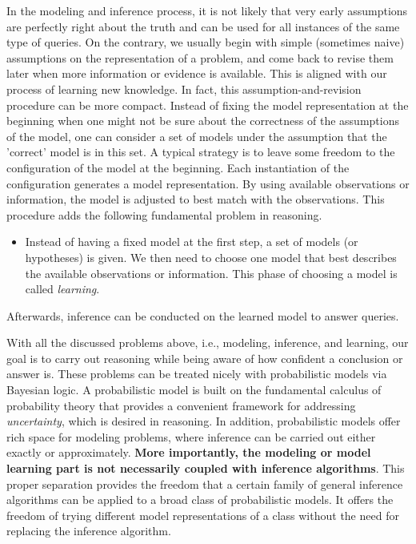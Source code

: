 In the modeling and inference process, it is not likely that very early assumptions are perfectly right about the truth and can be used for all instances of the same type of queries. On the contrary, we usually begin with simple (sometimes naive) assumptions on the representation of a problem, and come back to revise them later when more information or evidence is available. This is aligned with our process of learning new knowledge. In fact, this assumption-and-revision procedure can be more compact. Instead of fixing the model representation at the beginning when one might not be sure about the correctness of the assumptions of the model, one can consider a set of models under the assumption that the 'correct' model is in this set. A typical strategy is to leave some freedom to the configuration of the model at the beginning. Each instantiation of the configuration generates a model representation. By using available observations or information, the model is adjusted to best match with the observations. This procedure adds the following fundamental problem in reasoning.
\begin{itemize}
\item Instead of having a fixed model at the first step, a set of models (or hypotheses) is given. We then need to choose one model that best describes the available observations or information. This phase of choosing a model is called \textit{learning}. 
\end{itemize}
Afterwards, inference can be conducted on the learned model to answer queries.

With all the discussed problems above, i.e., modeling, inference, and learning, our goal is to carry out reasoning while being aware of how confident a conclusion or answer is. 
These problems can be treated nicely with probabilistic models via Bayesian logic. A probabilistic model is built on the fundamental calculus of probability theory that provides a convenient framework for addressing \textit{uncertainty}, which is desired in reasoning. In addition, probabilistic models offer rich space for modeling problems, where inference can be carried out either exactly or approximately. \textbf{More importantly, the modeling or model learning part is not necessarily coupled with inference algorithms}. This proper separation provides the freedom that a certain family of general inference algorithms can be applied to a broad class of probabilistic models. It offers the freedom of trying different model representations of a class without the need for replacing the inference algorithm.

